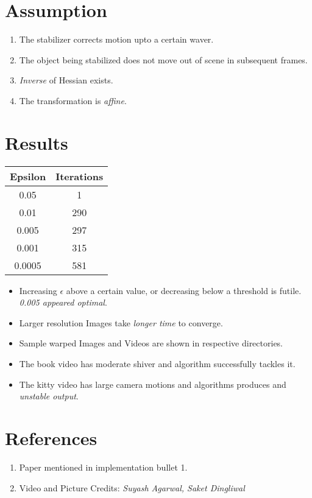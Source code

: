 \documentclass[12pt]{article}
\begin{document}
\section{Assumption}
\begin{enumerate}
    \item The stabilizer corrects motion upto a certain waver.  
    \item The object being stabilized does not move out of scene in subsequent frames.
    \item \emph{Inverse} of Hessian exists.
    \item The transformation is \emph{affine}.    
\end{enumerate}

\section{Results}
\begin{table}[h!]
\centering
\begin{tabular}{||c | c ||} 
    \hline
    Epsilon & Iterations \\
    [0.5ex]
    \hline\hline
    0.05 & 1\\
    0.01 & 290\\
    0.005 & 297\\
    0.001 & 315\\
    0.0005 & 581\\
\hline\hline

\end{tabular}
\end{table}

\begin{itemize}
    \item Increasing $\epsilon$ above a certain value, or decreasing below a threshold is futile. \emph{0.005 appeared optimal}.
    \item Larger resolution Images take \emph{longer time} to converge.
    \item Sample warped Images and Videos are shown in respective directories.
    \item The book video has moderate shiver and algorithm successfully tackles it.
    \item The kitty video has large camera motions and algorithms produces and \emph{unstable output}.
\end{itemize}

\section {References}
\begin{enumerate}
    \item Paper mentioned in implementation bullet 1.
    \item Video and Picture Credits:\emph{ Suyash Agarwal, Saket Dingliwal}
\end{enumerate}
\end{document}
